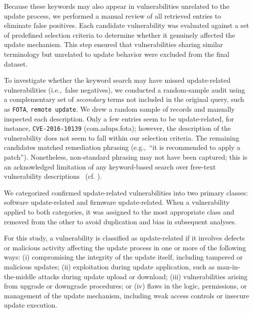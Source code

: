 \documentclass[fleqn,s1,names,tex]{neptune}
\begin{document}
Because these keywords may also appear in vulnerabilities unrelated to the update process, we performed a manual review of all retrieved entries to eliminate false positives. Each candidate vulnerability was evaluated against a set of predefined selection criteria to determine whether it genuinely affected the update mechanism. This step ensured that vulnerabilities sharing similar terminology but unrelated to update behavior were excluded from the final dataset.



To investigate whether the keyword search may have missed update-related vulnerabilities (i.e.,~false negatives), we conducted a random-sample audit using a complementary set of \emph{secondary} terms not included in the original query, such as \texttt{FOTA}, \texttt{remote update}.
We drew a random sample of records and manually inspected each description.
Only a few entries seem to be update-related, for instance,
\texttt{CVE-2016-10139} (com.adups.fota); however, the description of the vulnerability does not seem to fall within our selection criteria. 
The remaining candidates matched remediation phrasing (e.g.,~``it is recommended to apply a patch'').
Nonetheless, non-standard phrasing may not have been captured; this is an
acknowledged limitation of any keyword-based search over free-text
vulnerability descriptions~\citep{9723604} (cf.  ).






We categorized confirmed update-related vulnerabilities into two primary classes: software update-related and firmware update-related. When a vulnerability applied to both categories, it was assigned to the most appropriate class and removed from the other to avoid duplication and bias in subsequent analyses.


For this study, a vulnerability is classified as update-related if it involves defects or malicious activity affecting the update process in one or more of the following ways:
(i) compromising the integrity of the update itself, including tampered or malicious updates;
(ii) exploitation during update application, such as man-in-the-middle attacks during update upload or download;
(iii) vulnerabilities arising from upgrade or downgrade procedures; or
(iv) flaws in the logic, permissions, or management of the update mechanism, including weak access controls or insecure update execution.
\end{document}
